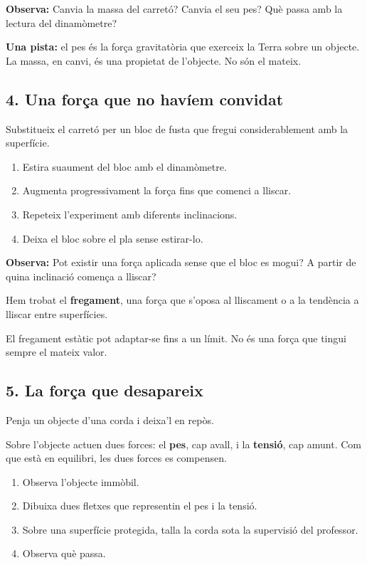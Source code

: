 \textbf{Observa:} Canvia la massa del carretó? Canvia el seu pes? Què passa amb la lectura del dinamòmetre?

\textbf{Una pista:} el pes és la força gravitatòria que exerceix la Terra sobre un objecte. La massa, en canvi, és una propietat de l'objecte. No són el mateix.

\subsection{4. Una força que no havíem convidat}

Substitueix el carretó per un bloc de fusta que fregui considerablement amb la superfície.

\begin{enumerate}
    \item Estira suaument del bloc amb el dinamòmetre.
    \item Augmenta progressivament la força fins que comenci a lliscar.
    \item Repeteix l'experiment amb diferents inclinacions.
    \item Deixa el bloc sobre el pla sense estirar-lo.
\end{enumerate}

\textbf{Observa:} Pot existir una força aplicada sense que el bloc es mogui? A partir de quina inclinació comença a lliscar?

Hem trobat el \textbf{fregament}, una força que s'oposa al lliscament o a la tendència a lliscar entre superfícies.

El fregament estàtic pot adaptar-se fins a un límit. No és una força que tingui sempre el mateix valor.

\subsection{5. La força que desapareix}

Penja un objecte d'una corda i deixa'l en repòs.

Sobre l'objecte actuen dues forces: el \textbf{pes}, cap avall, i la \textbf{tensió}, cap amunt. Com que està en equilibri, les dues forces es compensen.

\begin{enumerate}
    \item Observa l'objecte immòbil.
    \item Dibuixa dues fletxes que representin el pes i la tensió.
    \item Sobre una superfície protegida, talla la corda sota la supervisió del professor.
    \item Observa què passa.
\end{enumerate}

